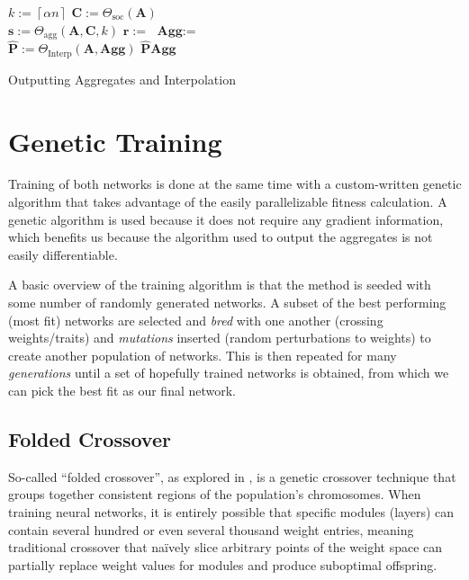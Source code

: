 \documentclass{article}
\newcommand{\mat}[1]{\bm{{#1}}}
\renewcommand{\vec}[1]{\bm{{#1}}}
\newcommand{\ceil}[1]{\left\lceil #1 \right\rceil}
\begin{document}
\begin{algorithm}
  \begin{algorithmic}
    \Procedure{FullAggNet}{$\mat{A}\in\mathbb{R}^{n \times n}, \alpha$}
    \State $k := \ceil{\alpha n}$ 
    \State $\mat{C} := \Theta_{\text{soc}}\left(\mat{A}\right)$ 
    \\
    \State $\vec{s} := \Theta_{\text{agg}}\left(\mat{A}, \mat{C}, k\right)$ 
    \State $\vec{r} := $ \Call{top-k}{$\vec{s}, k$} 
    \State $\mat{\text{Agg}} := $ \Call{Bellman-Ford}{$\mat{C}, \vec{r}$} 
    \\
    \State $\mat{\hat{P}} := \Theta_{\text{Interp}}\left(\mat{A}, \mat{\text{Agg}}\right)$ 
    \State \Return $\mat{\hat{P}} \mat{\text{Agg}}$ 
    \EndProcedure
  \end{algorithmic}
  \caption{Outputting Aggregates and Interpolation}
  \label{alg:algo}
\end{algorithm}

\section{Genetic Training}
Training of both networks is done at the same time with a custom-written genetic algorithm that takes advantage of the easily parallelizable fitness calculation.  A genetic algorithm is used because it does not require any gradient information\cite{Mitchell1998-sp}, which benefits us because the algorithm used to output the aggregates is not easily differentiable.

A basic overview of the training algorithm is that the method is seeded with some number of randomly generated networks. A subset of the best performing (most fit) networks are selected and \textit{bred} with one another (crossing weights/traits) and \textit{mutations} inserted (random perturbations to weights) to create another population of networks.  This is then repeated for many \textit{generations} until a set of hopefully trained networks is obtained, from which we can pick the best fit as our final network.

\subsection{Folded Crossover}
So-called ``folded crossover'', as explored in \cite{GA_CNN}, is a genetic crossover technique that groups together consistent regions of the population's chromosomes.  When training neural networks, it is entirely possible that specific modules (layers) can contain several hundred or even several thousand weight entries, meaning traditional crossover that na\"ively slice arbitrary points of the weight space can partially replace weight values for modules and produce suboptimal offspring.
\end{document}
